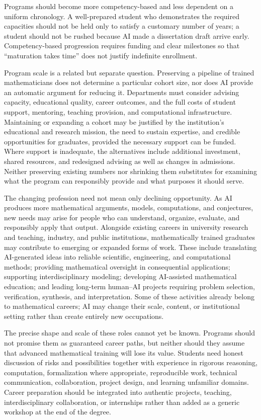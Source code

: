 \documentclass[11pt]{article}
\begin{document}
Programs should become more competency-based and less dependent on a uniform chronology.
A well-prepared student who demonstrates the required capacities should not be held only
to satisfy a customary number of years; a student should not be rushed because AI made a
dissertation draft arrive early.  Competency-based progression requires funding and clear
milestones so that ``maturation takes time'' does not justify indefinite enrollment.

Program scale is a related but separate question. Preserving a pipeline of trained
mathematicians does not determine a particular cohort size, nor does AI provide an
automatic argument for reducing it. Departments must consider advising capacity,
educational quality, career outcomes, and the full costs of student support, mentoring,
teaching provision, and computational infrastructure. Maintaining or expanding a cohort
may be justified by the institution's educational and research mission, the need to
sustain expertise, and credible opportunities for graduates, provided the necessary
support can be funded. Where support is inadequate, the alternatives include additional
investment, shared resources, and redesigned advising as well as changes in admissions.
Neither preserving existing numbers nor shrinking them substitutes for examining what
the program can responsibly provide and what purposes it should serve.

The changing profession need not mean only declining opportunity.  As AI produces more
mathematical arguments, models, computations, and conjectures, new needs may arise for
people who can understand, organize, evaluate, and responsibly apply that output.
Alongside existing careers in university research and teaching, industry, and public
institutions, mathematically trained graduates may contribute to emerging or expanded
forms of work. These include translating AI-generated ideas into reliable scientific,
engineering, and computational methods; providing mathematical oversight in
consequential applications; supporting interdisciplinary modeling; developing
AI-assisted mathematical education; and leading long-term human--AI projects requiring
problem selection, verification, synthesis, and interpretation. Some of these activities
already belong to mathematical careers; AI may change their scale, content, or
institutional setting rather than create entirely new occupations.

The precise shape and scale of these roles cannot yet be known.  Programs should not
promise them as guaranteed career paths, but neither should they assume that advanced
mathematical training will lose its value.  Students need honest discussion of risks and
possibilities together with experience in rigorous reasoning, computation, formalization
where appropriate, reproducible work, technical communication, collaboration, project
design, and learning unfamiliar domains.  Career preparation should be integrated into
authentic projects, teaching, interdisciplinary collaboration, or internships rather than
added as a generic workshop at the end of the degree.
\end{document}

